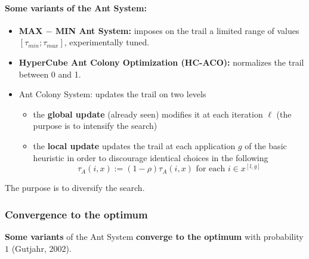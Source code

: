 \documentclass[11pt]{article}
\begin{document}
	\newpage
	
	\paragraph{Some variants of the Ant System:}
	\begin{itemize}
		\item \textbf{MAX $-$ MIN Ant System:} imposes on the trail a limited range of values $[\tau_{min}; \tau_{max}]$, experimentally tuned.\\
		
		\item \textbf{HyperCube Ant Colony Optimization (HC-ACO):} normalizes the trail between 0 and 1.\\
		
		\item Ant Colony System: updates the trail on two levels
		\begin{itemize}
			\item the \textbf{global update} (already seen) modifies it at each iteration $\ell$ (the purpose is to intensify the search)
			
			\item the \textbf{local update} updates the trail at each application $g$ of the basic heuristic in order to discourage identical choices in the following
			$$ \tau_A (i, x) := (1 - \rho) \tau_A (i, x) \text{ for each } i \in x^{[l,g]}$$
		\end{itemize}
		\nn
	\end{itemize}
	The purpose is to diversify the search.\\
	
	\newpage
	
	\subsubsection{Convergence to the optimum}
	\textbf{Some variants} of the Ant System \textbf{converge to the optimum} with probability $1$ (Gutjahr, 2002).\\
	
\end{document}
